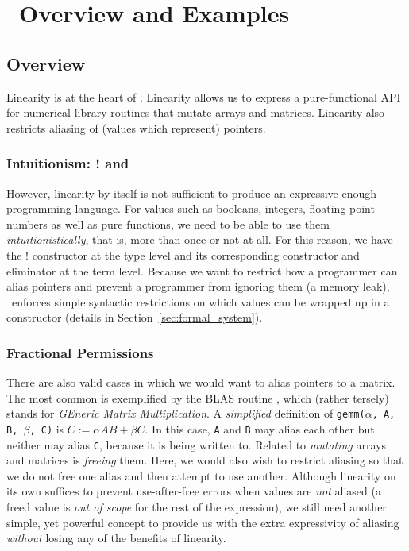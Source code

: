 \section{\lang\ Overview and Examples}\label{sec:lang_and_examples}

\subsection{Overview}

Linearity is at the heart of \lang. Linearity allows us to express a
pure-functional API for numerical library routines that mutate arrays and
matrices. Linearity also restricts aliasing of (values which represent)
pointers.

\subsubsection{Intuitionism: ! and }

However, linearity by itself is not sufficient to produce an expressive enough
programming language. For values such as booleans, integers, floating-point
numbers as well as pure functions, we need to be able to use them
\emph{intuitionistically}, that is, more than once or not at all. For this
reason, we have the ! constructor at the type level and its corresponding
 constructor and  eliminator at
the term level. Because we want to restrict how a programmer can alias pointers
and prevent a programmer from ignoring them (a memory leak), \lang\ enforces
simple syntactic restrictions on which values can be wrapped up in a
 constructor (details in Section~\ref{sec:formal_system}).

\subsubsection{Fractional Permissions}

There are also valid cases in which we would want to alias pointers to a
matrix. The most common is exemplified by the BLAS routine , which
(rather tersely) stands for \emph{GEneric Matrix Multiplication}.  A
\emph{simplified} definition of \texttt{gemm($\alpha$, A, B, $\beta$, C)} is $C
:= \alpha AB + \beta C$. In this case, \texttt{A} and \texttt{B} may alias each
other but neither may alias \texttt{C}, because it is being written to.
Related to \emph{mutating} arrays and matrices is \emph{freeing} them. Here, we
would also wish to restrict aliasing so that we do not free one alias and then
attempt to use another. Although linearity on its own suffices to prevent
use-after-free errors when values are \emph{not} aliased (a freed value is
\emph{out of scope} for the rest of the expression), we still need another
simple, yet powerful concept to provide us with the extra expressivity of
aliasing \emph{without} losing any of the benefits of linearity.


